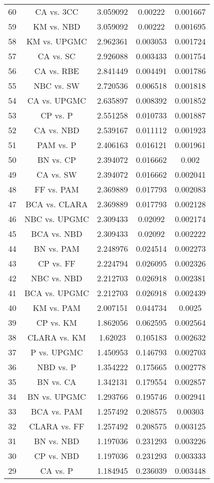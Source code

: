 \documentclass[a4paper,10pt]{article}
\begin{document}
\begin{landscape}
\begin{table}[!htp]
\begin{tabular}{ccccc}
60&CA vs. 3CC&3.059092&0.00222&0.001667\\
59&KM vs. NBD&3.059092&0.00222&0.001695\\
58&KM vs. UPGMC&2.962361&0.003053&0.001724\\
57&CA vs. SC&2.926088&0.003433&0.001754\\
56&CA vs. RBE&2.841449&0.004491&0.001786\\
55&NBC vs. SW&2.720536&0.006518&0.001818\\
54&CA vs. UPGMC&2.635897&0.008392&0.001852\\
53&CP vs. P&2.551258&0.010733&0.001887\\
52&CA vs. NBD&2.539167&0.011112&0.001923\\
51&PAM vs. P&2.406163&0.016121&0.001961\\
50&BN vs. CP&2.394072&0.016662&0.002\\
49&CA vs. SW&2.394072&0.016662&0.002041\\
48&FF vs. PAM&2.369889&0.017793&0.002083\\
47&BCA vs. CLARA&2.369889&0.017793&0.002128\\
46&NBC vs. UPGMC&2.309433&0.02092&0.002174\\
45&BCA vs. NBD&2.309433&0.02092&0.002222\\
44&BN vs. PAM&2.248976&0.024514&0.002273\\
43&CP vs. FF&2.224794&0.026095&0.002326\\
42&NBC vs. NBD&2.212703&0.026918&0.002381\\
41&BCA vs. UPGMC&2.212703&0.026918&0.002439\\
40&KM vs. PAM&2.007151&0.044734&0.0025\\
39&CP vs. KM&1.862056&0.062595&0.002564\\
38&CLARA vs. KM&1.62023&0.105183&0.002632\\
37&P vs. UPGMC&1.450953&0.146793&0.002703\\
36&NBD vs. P&1.354222&0.175665&0.002778\\
35&BN vs. CA&1.342131&0.179554&0.002857\\
34&BN vs. UPGMC&1.293766&0.195746&0.002941\\
33&BCA vs. PAM&1.257492&0.208575&0.00303\\
32&CLARA vs. FF&1.257492&0.208575&0.003125\\
31&BN vs. NBD&1.197036&0.231293&0.003226\\
30&CP vs. NBD&1.197036&0.231293&0.003333\\
29&CA vs. P&1.184945&0.236039&0.003448\\

\end{tabular}
\end{table}
\end{landscape}
\end{document}
